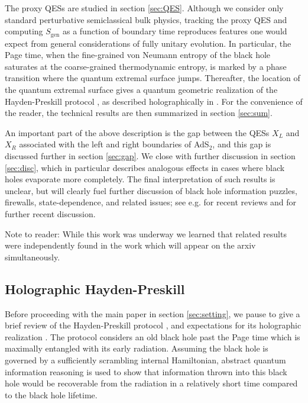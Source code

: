 \documentclass[12pt]{article}
\begin{document}
The proxy QESs are studied in section \ref{sec:QES}.
Although we consider only standard perturbative semiclassical bulk physics, tracking the proxy QES and computing $S_{\mathrm{gen}}$ as a function of boundary time reproduces features one would expect from general considerations of fully unitary evolution. In particular, the Page time, when the fine-grained von Neumann entropy of the black hole saturates at the coarse-grained thermodynamic entropy, is marked by a phase transition where the quantum extremal surface jumps. Thereafter, the location of the quantum extremal surface gives a quantum geometric realization of the Hayden-Preskill protocol \cite{Hayden:2007cs}, as described holographically in \cite{Almheiri:2018xdw}.  For the convenience of the reader, the technical results are then summarized in section \ref{sec:sum}.

An important part of the above description is the gap between the QESs $X_L$ and $X_R$ associated with the left and right boundaries of AdS$_2$, and this gap is discussed further in section \ref{sec:gap}.
We close with further discussion in section \ref{sec:disc}, which in particular describes analogous effects in cases where black holes evaporate more completely.  The final interpretation of such results is unclear, but will clearly fuel further discussion of black hole information puzzles, firewalls, state-dependence, and related issues; see e.g. \cite{Harlow:2014yka,Marolf:2017jkr} for recent reviews and \cite{Almheiri:2018xdw} for further recent discussion.

Note to reader: While this work was underway we learned that related results were independently found in the work \cite{Penington:2019npb} which will appear on the arxiv simultaneously.



\subsection{Holographic Hayden-Preskill}
\label{sec:HoloHP}



Before proceeding with the main paper in section \ref{sec:setting}, we pause to give a brief review of the Hayden-Preskill protocol \cite{Hayden:2007cs}, and expectations for its holographic realization \cite{Almheiri:2018xdw}. The protocol  considers an old black hole past the Page time which is maximally entangled with its early radiation. Assuming the black hole is governed by a sufficiently scrambling internal Hamiltonian, abstract quantum information reasoning is used to show that information thrown into this black hole would be recoverable from the radiation in a relatively short time compared to the black hole lifetime.
\end{document}
